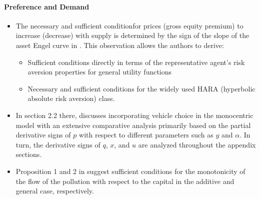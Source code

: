 \documentclass[11pt]{book}
\begin{document}
\paragraph{Preference and Demand}
\begin{itemize}
\item The necessary and sufficient conditionfor prices (gross equity premium)
to increase (decrease) with supply is determined by the sign of the
slope of the asset Engel curve in \cite{kubler2011theory}.
This observation allows the authors to derive:
\begin{itemize}
\item Sufficient conditions directly in terms of the representative agent's
risk aversion properties for general utility functions
\item Necessary and sufficient conditions for the widely used HARA (hyperbolic
absolute risk aversion) class.
\end{itemize}
\item In section 2.2 there, \cite{kim2012endogenous}
discusses incorporating vehicle choice in the monocentric model with
an extensive comparative analysis primarily based on the partial derivative
signs of $p$ with respect to different parameters such as $y$ and
$\alpha$. In turn, the derivative signs of $q$, $x$, and $u$ are
analyzed throughout the appendix sections.
\item Proposition 1 and 2 in \cite{figueroa2015beyond}
suggest sufficient conditions for the monotonicity of the flow of
the pollution with respect to the capital in the additive and general
case, respectively.
\end{itemize}
\end{document}

